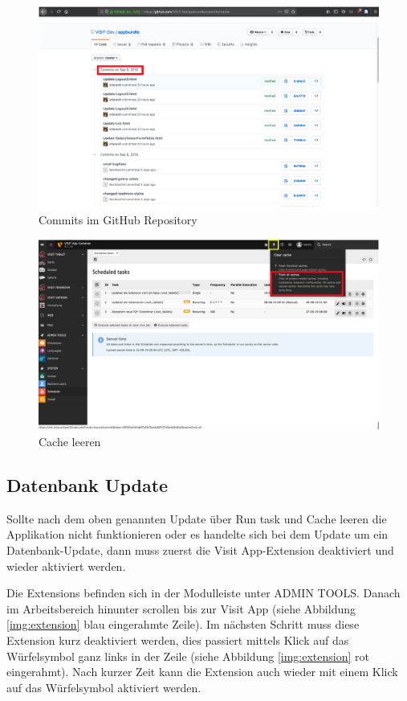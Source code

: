 \begin{figure}[ht!]
\centering
\includegraphics[width=12cm]{Figures/paula/update_prozess/commits.png}
\caption{Commits im GitHub Repository}
\label{img:commits}
\end{figure}

\begin{figure}[ht!]
\centering
\includegraphics[width=12cm]{Figures/paula/update_prozess/cache.png}
\caption{Cache leeren}
\label{img:cache}
\end{figure}

\subsection{Datenbank Update}

Sollte nach dem oben genannten Update über \glqq Run task\grqq{} und Cache leeren die Applikation nicht funktionieren oder es handelte sich bei dem Update um ein Datenbank-Update, dann muss zuerst die Visit App-Extension deaktiviert und wieder aktiviert werden.

Die Extensions befinden sich in der Modulleiste unter ADMIN TOOLS. Danach im Arbeitsbereich hinunter scrollen bis zur Visit App (siehe Abbildung \ref{img:extension} blau eingerahmte Zeile). Im nächsten Schritt muss diese Extension kurz deaktiviert werden, dies passiert mittels Klick auf das Würfelsymbol ganz links in der Zeile (siehe Abbildung \ref{img:extension} rot eingerahmt). Nach kurzer Zeit kann die Extension auch wieder mit einem Klick auf das Würfelsymbol aktiviert werden.

